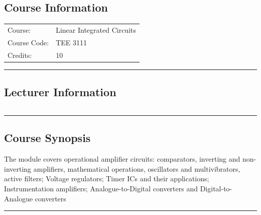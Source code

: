 
\subsection*{Course Information}
\vspace{0ex}%
\noindent\parbox{0.5\textwidth}{%
    \noindent\begin{tabular}{@{}ll}
                 \textsf{Course:}          & 	Linear Integrated Circuits   \\
                 \textsf{Course Code:}         & 	TEE 3111    \\
                 \textsf{Credits:}    & 	10
    \end{tabular}}
\vspace{2ex}\hrule\vspace{2ex}

\subsection*{Lecturer Information}
\noindent\parbox{0.5\textwidth}{%
    \noindent\begin{tabular}{@{}ll}
                 
    \end{tabular}}
\vspace{2ex}\hrule\vspace{2ex}


\subsection*{Course Synopsis}
The module covers operational amplifier circuits: comparators, inverting and non-inverting amplifiers,
mathematical operations, oscillators and multivibrators, active filters; Voltage regulators; Timer ICs and
their applications; Instrumentation amplifiers; Analogue-to-Digital converters and Digital-to-Analogue
converters
\vspace{2ex} \hrule\vspace{2ex}

